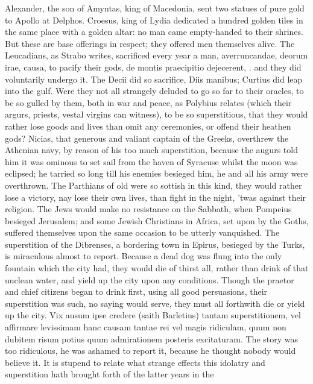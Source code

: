 {Alexander, the son of Amyntas, king of Macedonia, sent two
statues of pure gold to Apollo at Delphos. Croesus, king of Lydia
dedicated a hundred golden tiles in the same place with a golden altar:
no man came empty-handed to their shrines. But these are base offerings
in respect; they offered men themselves alive. The Leucadians, as
Strabo writes, sacrificed every year a man, averruncandae, deorum irae,
causa, to pacify their gods, de montis praecipitio dejecerent, \etc{}. and
they did voluntarily undergo it. The Decii did so sacrifice, Diis
manibus; Curtius did leap into the gulf. Were they not all strangely
deluded to go so far to their oracles, to be so gulled by them, both in
war and peace, as Polybius relates (which their argurs, priests, vestal
virgins can witness), to be so superstitious, that they would rather
lose goods and lives than omit any ceremonies, or offend their heathen
gods? Nicias, that generous and valiant captain of the Greeks,
overthrew the Athenian navy, by reason of his too much superstition,
 because the augurs told him it was ominous to set sail from the
haven of Syracuse whilst the moon was eclipsed; he tarried so long till
his enemies besieged him, he and all his army were overthrown. The
Parthians of old were so sottish in this kind, they would rather
lose a victory, nay lose their own lives, than fight in the night,
'twas against their religion. The Jews would make no resistance on the
Sabbath, when Pompeius besieged Jerusalem; and some Jewish Christians
in Africa, set upon by the Goths, suffered themselves upon the same
occasion to be utterly vanquished. The superstition of the Dibrenses, a
bordering town in Epirus, besieged by the Turks, is miraculous almost
to report. Because a dead dog was flung into the only fountain which
the city had, they would die of thirst all, rather than drink of that
unclean water, and yield up the city upon any conditions. Though
the praetor and chief citizens began to drink first, using all good
persuasions, their superstition was such, no saying would serve, they
must all forthwith die or yield up the city. Vix ausum ipse credere
(saith Barletius) tantam superstitionem, vel affirmare levissimam
hanc causam tantae rei vel magis ridiculam, quum non dubitem risum
potius quum admirationem posteris excitaturam. The story was too
ridiculous, he was ashamed to report it, because he thought nobody
would believe it. It is stupend to relate what strange effects this
idolatry and superstition hath brought forth of the latter years in the
}
